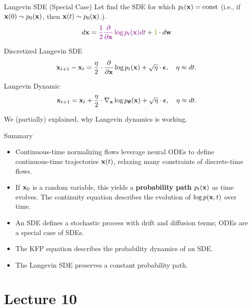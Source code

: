 \documentclass{beamer}
\renewcommand{\eqpause}{}
\begin{document}
\begin{frame}{Langevin SDE (Special Case)}
	Let find the SDE for which $p_t(\mathbf{x}) = \text{const}$ (i.e., if $\mathbf{x}(0) \sim p_0(\mathbf{x})$, then $\mathbf{x}(t) \sim p_0(\mathbf{x})$.).
	\[
		d \bx = {\color{violet}\frac{1}{2} \frac{\partial}{\partial \bx} \log p_t(\bx) d t} + {\color{olive}1} \cdot d \bw
	\]
	\eqpause
	\begin{block}{Discretized Langevin SDE}
		\vspace{-0.3cm}
		\[
			\mathbf{x}_{t + 1} - \mathbf{x}_t = \frac{\eta}{2} \cdot \frac{\partial}{\partial \mathbf{x}} \log p_t(\mathbf{x}) + \sqrt{\eta} \cdot \boldsymbol{\epsilon}, \quad \eta \approx dt.
		\]
		\vspace{-0.4cm}
	\end{block}
	\eqpause
	\begin{block}{Langevin Dynamic}
		\vspace{-0.3cm}
		\[
			\mathbf{x}_{t + 1} = \mathbf{x}_t + \frac{\eta}{2} \cdot \nabla_{\mathbf{x}} \log p_{\boldsymbol{\theta}}(\mathbf{x}) + \sqrt{\eta} \cdot \boldsymbol{\epsilon}, \quad \eta \approx dt.
		\]
		\vspace{-0.3cm}
	\end{block}
	We (partially) explained, why Langevin dynamics is working.
\end{frame}
\begin{frame}{Summary}
	\begin{itemize}
		\item Continuous-time normalizing flows leverage neural ODEs to define continuous-time trajectories $\mathbf{x}(t)$, relaxing many constraints of discrete-time flows.
		\vfill
		\item If $\mathbf{x}_0$ is a random variable, this yields a \textbf{probability path} $p_t(\mathbf{x})$ as time evolves. The continuity equation describes the evolution of $\log p(\mathbf{x}, t)$ over time.
		\vfill
		\item An SDE defines a stochastic process with drift and diffusion terms; ODEs are a special case of SDEs.
		\vfill
		\item The KFP equation describes the probability dynamics of an SDE.
		\vfill
		\item The Langevin SDE preserves a constant probability path.
	\end{itemize}
\end{frame}

\part{Lecture 10}
\end{document}
